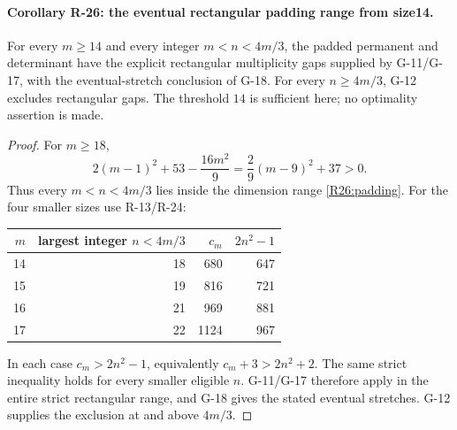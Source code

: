 \paragraph{Corollary R-26: the eventual rectangular padding range from size14.}
For every $m\geq14$ and every integer $m<n<4m/3$, the padded
permanent and determinant have the explicit rectangular
multiplicity gaps supplied by G-11/G-17, with the eventual-stretch
conclusion of G-18. For every $n\geq4m/3$, G-12 excludes
rectangular gaps. The threshold $14$ is sufficient here; no
optimality assertion is made.

\begin{proof}
For $m\geq18$,
\[
 2(m-1)^2+53-\frac{16m^2}{9}
       =\frac29(m-9)^2+37>0.
\]
Thus every $m<n<4m/3$ lies inside the dimension range
\eqref{R26:padding}. For the four smaller sizes use R-13/R-24:
\begin{center}
\begin{tabular}{rrrr}
$m$&largest integer $n<4m/3$&$c_m$&$2n^2-1$\\ \hline
14&18&680&647\\
15&19&816&721\\
16&21&969&881\\
17&22&1124&967
\end{tabular}
\end{center}
In each case $c_m>2n^2-1$, equivalently
$c_m+3>2n^2+2$. The same strict inequality holds for every
smaller eligible $n$. G-11/G-17 therefore apply in the entire
strict rectangular range, and G-18 gives the stated eventual
stretches. G-12 supplies the exclusion at and above $4m/3$.
\end{proof}
